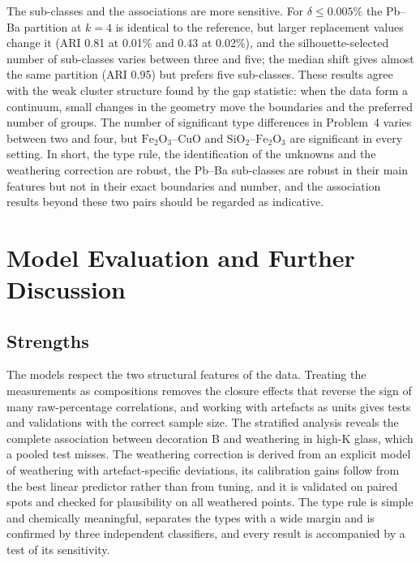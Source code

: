 \documentclass[11pt,a4paper]{article}
\newcommand{\ox}[1]{\ensuremath{\mathrm{#1}}}
\begin{document}
The sub-classes and the associations are more sensitive.
For $\delta\le0.005\%$ the Pb--Ba partition at $k=4$ is identical to the reference, but larger replacement values change it (ARI 0.81 at 0.01\% and 0.43 at 0.02\%), and the silhouette-selected number of sub-classes varies between three and five; the median shift gives almost the same partition (ARI 0.95) but prefers five sub-classes.
These results agree with the weak cluster structure found by the gap statistic: when the data form a continuum, small changes in the geometry move the boundaries and the preferred number of groups.
The number of significant type differences in Problem~4 varies between two and four, but \ox{Fe_2O_3}--CuO and \ox{SiO_2}--\ox{Fe_2O_3} are significant in every setting.
In short, the type rule, the identification of the unknowns and the weathering correction are robust, the Pb--Ba sub-classes are robust in their main features but not in their exact boundaries and number, and the association results beyond these two pairs should be regarded as indicative.

\section{Model Evaluation and Further Discussion}\label{sec:evaluation}

\subsection{Strengths}
The models respect the two structural features of the data.
Treating the measurements as compositions removes the closure effects that reverse the sign of many raw-percentage correlations, and working with artefacts as units gives tests and validations with the correct sample size.
The stratified analysis reveals the complete association between decoration B and weathering in high-K glass, which a pooled test misses.
The weathering correction is derived from an explicit model of weathering with artefact-specific deviations, its calibration gains follow from the best linear predictor rather than from tuning, and it is validated on paired spots and checked for plausibility on all weathered points.
The type rule is simple and chemically meaningful, separates the types with a wide margin and is confirmed by three independent classifiers, and every result is accompanied by a test of its sensitivity.
\end{document}
